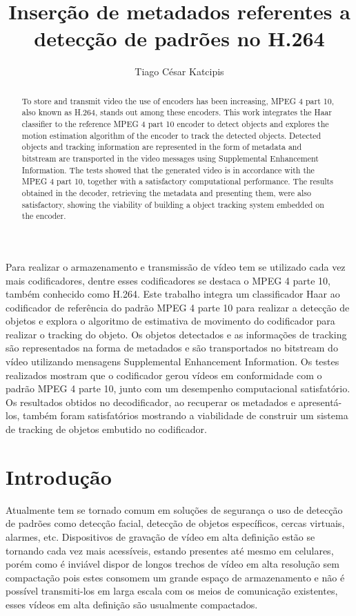 \documentclass[12pt]{article}
\title{Inserção de metadados referentes a detecção de padrões no H.264}
\author{Tiago César Katcipis\inst{1}}
\begin{document}
 

\maketitle

\begin{abstract}
To store and transmit video the use of encoders has been increasing, MPEG 4 part 10, also known as H.264, stands out among these encoders. This work integrates the Haar classifier to the reference MPEG 4 part 10 encoder to detect objects and explores the motion estimation algorithm of the encoder to track the detected objects. Detected objects and tracking information are represented in the form of metadata and bitstream are transported in the video messages using Supplemental Enhancement Information. The tests showed that the generated video is in accordance with the MPEG 4 part 10, together with a satisfactory computational performance. The results obtained in the decoder, retrieving the metadata and presenting them, were also satisfactory, showing the viability of building a object tracking system embedded on the encoder.
\end{abstract}
  
\begin{resumo} 
Para realizar o armazenamento e transmissão de vídeo tem se utilizado cada vez mais codificadores, dentre esses codificadores se destaca o MPEG 4 parte 10, também conhecido como H.264. Este trabalho integra um classificador Haar ao codificador de referência do padrão MPEG 4 parte 10 para realizar a detecção de objetos e explora o algoritmo de estimativa de movimento do codificador para realizar o tracking do objeto. Os objetos detectados e as informações de tracking são representados na forma de metadados e são transportados no bitstream do vídeo utilizando mensagens Supplemental Enhancement Information. Os testes realizados mostram que o codificador gerou vídeos em conformidade com o padrão  MPEG 4 parte 10, junto com um desempenho computacional satisfatório. Os resultados obtidos no decodificador, ao recuperar os metadados e apresentá-los, também foram satisfatórios mostrando a viabilidade de construir um sistema de tracking de objetos embutido no codificador.
\end{resumo}

\section*{Introdução}

Atualmente tem se tornado comum em soluções de segurança o uso de detecção de padrões como detecção facial, detecção de objetos específicos, cercas virtuais, alarmes, etc. Dispositivos de gravação de vídeo em alta definição estão se tornando cada vez mais acessíveis, estando presentes até mesmo em celulares, porém como é inviável dispor de longos trechos de vídeo em alta resolução sem compactação pois estes consomem um grande espaço de armazenamento e não é possível transmiti-los em larga escala com os meios de comunicação existentes, esses vídeos em alta definição são usualmente compactados.
\end{document}
